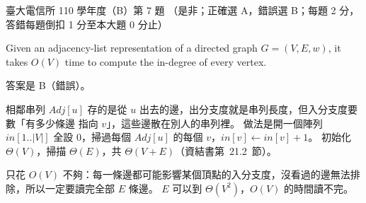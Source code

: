 \begin{pastexam}[label={px:ntu-110-comm-dsa-07}]{臺大電信所 110 學年度（B）第 7 題}
（是非；正確選 A，錯誤選 B；每題 2 分，答錯每題倒扣 1 分至本大題 0 分止）

Given an adjacency-list representation of a directed graph $G=(V,E,w)$, it takes $O(V)$ time to compute the in-degree of every vertex.
\end{pastexam}

\begin{pastsoln}
答案是 B（錯誤）。

相鄰串列 $\mathit{Adj}[u]$ 存的是從 $u$ 出去的邊，出分支度就是串列長度，但入分支度要數「有多少條邊
指向 $v$」，這些邊散在別人的串列裡。 做法是開一個陣列 $\mathit{in}[1..|V|]$ 全設 $0$，掃過每個
$\mathit{Adj}[u]$ 的每個 $v$，$\mathit{in}[v] \gets \mathit{in}[v] + 1$。 初始化 $\Theta(V)$，掃描
$\Theta(E)$，共 $\Theta(V + E)$（資結書第~21.2~節）。

只花 $O(V)$ 不夠：每一條邊都可能影響某個頂點的入分支度，沒看過的邊無法排除，所以一定要讀完全部
$E$ 條邊。 $E$ 可以到 $\Theta(V^2)$，$O(V)$ 的時間讀不完。
\end{pastsoln}
